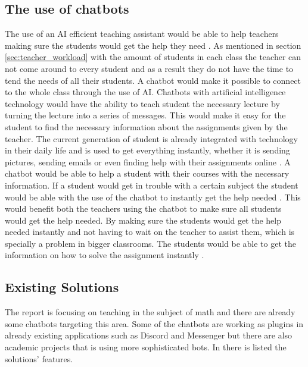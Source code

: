 \subsection{The use of chatbots}
The use of an AI efficient teaching assistant would be able to help teachers making sure the students would get the help they need \cite{Singh2018AIFutureHold}.
As mentioned in section \ref{sec:teacher_workload} with the amount of students in each class the teacher can not come around to every student and as a result they do not have the time to tend the needs of all their students.
\newline\newline
A chatbot would make it possible to connect to the whole class through the use of AI. Chatbots with artificial intelligence technology would have the ability to teach student the necessary lecture by turning the lecture into a series of messages. This would make it easy for the student to find the necessary information about the assignments given by the teacher.
The current generation of student is already integrated with technology in their daily life and is used to get everything instantly, whether it is sending pictures, sending emails or even finding help with their assignments online \cite{Singh2018AIFutureHold}. 
\newline\noindent
A chatbot would be able to help a student with their courses with the necessary information. If a student would get in trouble with a certain subject the student would be able with the use of the chatbot to instantly get the help needed \cite{Singh2018AIFutureHold}.
\newline\newline
This would benefit both the teachers using the chatbot to make sure all students would get the help needed.
By making sure the students would get the help needed instantly and not having to wait on the teacher to assist them, which is specially a problem in bigger classrooms. The students would be able to get the information on how to solve the assignment instantly \cite{Gibori2012TheStudents}.

\subsection{Existing Solutions}
\label{sub:Existing Solutions}
The report is focusing on teaching in the subject of math and there are already some chatbots targeting this area. Some of the chatbots are working as plugins in already existing applications such as Discord \cite{DiscordDownloads} and Messenger \cite{Messenger} but there are also academic projects that is using more sophisticated bots. In  there is listed the solutions' features.

